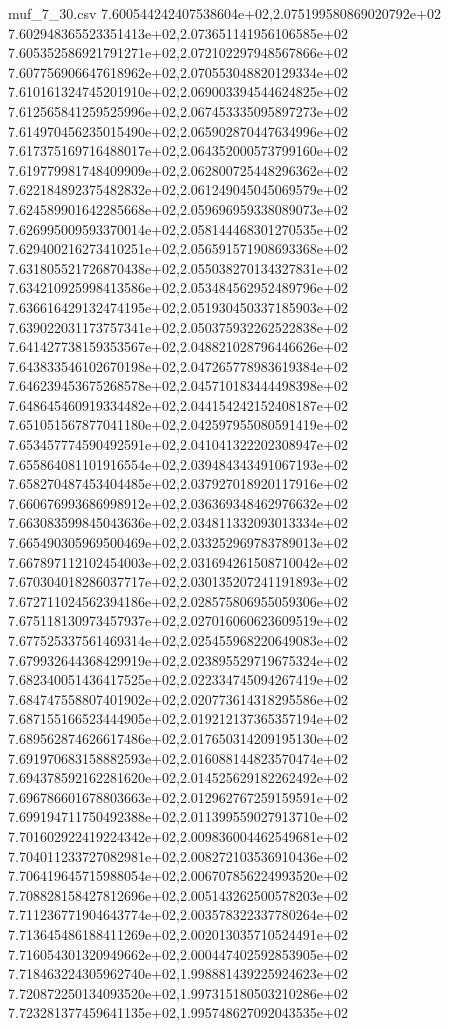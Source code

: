 \begin{filecontents*}{muf_7_30.csv}
7.600544242407538604e+02,2.075199580869020792e+02
7.602948365523351413e+02,2.073651141956106585e+02
7.605352586921791271e+02,2.072102297948567866e+02
7.607756906647618962e+02,2.070553048820129334e+02
7.610161324745201910e+02,2.069003394544624825e+02
7.612565841259525996e+02,2.067453335095897273e+02
7.614970456235015490e+02,2.065902870447634996e+02
7.617375169716488017e+02,2.064352000573799160e+02
7.619779981748409909e+02,2.062800725448296362e+02
7.622184892375482832e+02,2.061249045045069579e+02
7.624589901642285668e+02,2.059696959338089073e+02
7.626995009593370014e+02,2.058144468301270535e+02
7.629400216273410251e+02,2.056591571908693368e+02
7.631805521726870438e+02,2.055038270134327831e+02
7.634210925998413586e+02,2.053484562952489796e+02
7.636616429132474195e+02,2.051930450337185903e+02
7.639022031173757341e+02,2.050375932262522838e+02
7.641427738159353567e+02,2.048821028796446626e+02
7.643833546102670198e+02,2.047265778983619384e+02
7.646239453675268578e+02,2.045710183444498398e+02
7.648645460919334482e+02,2.044154242152408187e+02
7.651051567877041180e+02,2.042597955080591419e+02
7.653457774590492591e+02,2.041041322202308947e+02
7.655864081101916554e+02,2.039484343491067193e+02
7.658270487453404485e+02,2.037927018920117916e+02
7.660676993686998912e+02,2.036369348462976632e+02
7.663083599845043636e+02,2.034811332093013334e+02
7.665490305969500469e+02,2.033252969783789013e+02
7.667897112102454003e+02,2.031694261508710042e+02
7.670304018286037717e+02,2.030135207241191893e+02
7.672711024562394186e+02,2.028575806955059306e+02
7.675118130973457937e+02,2.027016060623609519e+02
7.677525337561469314e+02,2.025455968220649083e+02
7.679932644368429919e+02,2.023895529719675324e+02
7.682340051436417525e+02,2.022334745094267419e+02
7.684747558807401902e+02,2.020773614318295586e+02
7.687155166523444905e+02,2.019212137365357194e+02
7.689562874626617486e+02,2.017650314209195130e+02
7.691970683158882593e+02,2.016088144823570474e+02
7.694378592162281620e+02,2.014525629182262492e+02
7.696786601678803663e+02,2.012962767259159591e+02
7.699194711750492388e+02,2.011399559027913710e+02
7.701602922419224342e+02,2.009836004462549681e+02
7.704011233727082981e+02,2.008272103536910436e+02
7.706419645715988054e+02,2.006707856224993520e+02
7.708828158427812696e+02,2.005143262500578203e+02
7.711236771904643774e+02,2.003578322337780264e+02
7.713645486188411269e+02,2.002013035710524491e+02
7.716054301320949662e+02,2.000447402592853905e+02
7.718463224305962740e+02,1.998881439225924623e+02
7.720872250134093520e+02,1.997315180503210286e+02
7.723281377459641135e+02,1.995748627092043535e+02

\end{filecontents*}
